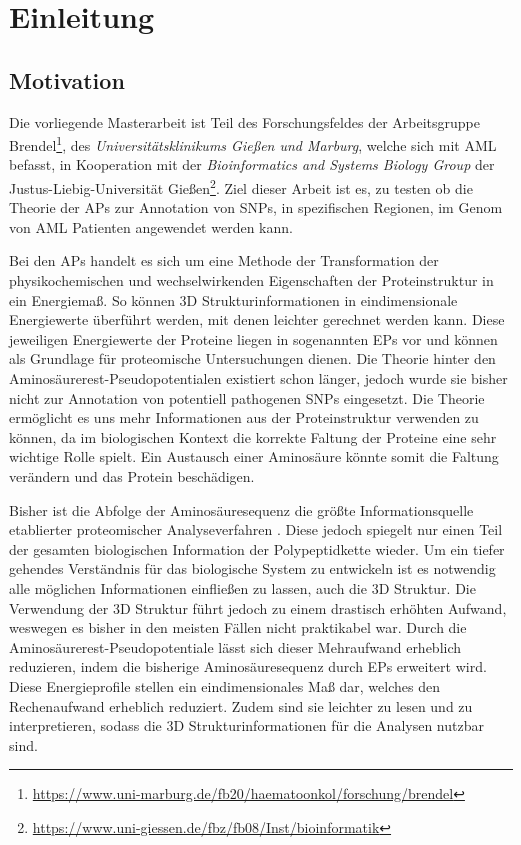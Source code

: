 \chapter{Einleitung}
\label{cha:Einleitung}

\section{Motivation}

Die vorliegende Masterarbeit ist Teil des Forschungsfeldes der Arbeitsgruppe Brendel\footnote{\url{https://www.uni-marburg.de/fb20/haematoonkol/forschung/brendel}}, des \emph{Universitätsklinikums Gießen und Marburg}, welche sich mit \ac{AML} befasst, in Kooperation mit der \emph{Bioinformatics and Systems Biology Group} der Justus-Liebig-Universität Gießen\footnote{\url{https://www.uni-giessen.de/fbz/fb08/Inst/bioinformatik}}. Ziel dieser Arbeit ist es, zu testen ob die Theorie der \ac{APs} zur Annotation von \ac{SNPs}, in spezifischen Regionen, im Genom von \ac{AML} Patienten angewendet werden kann.

Bei den \ac{APs} handelt es sich um eine Methode der Transformation der physikochemischen und wechselwirkenden Eigenschaften der Proteinstruktur in ein Energiemaß. So können 3D Strukturinformationen in eindimensionale Energiewerte überführt werden, mit denen leichter gerechnet werden kann. Diese jeweiligen Energiewerte der Proteine liegen in sogenannten \ac{EPs} vor und können als Grundlage für proteomische Untersuchungen dienen. Die Theorie hinter den Aminosäurerest-Pseudopotentialen existiert schon länger, jedoch wurde sie bisher nicht zur Annotation von potentiell pathogenen \ac{SNPs} eingesetzt. Die Theorie ermöglicht es uns mehr Informationen aus der Proteinstruktur verwenden zu können, da im biologischen Kontext die korrekte Faltung der Proteine eine sehr wichtige Rolle spielt. Ein Austausch einer Aminosäure könnte somit die Faltung verändern und das Protein beschädigen. 

Bisher ist die Abfolge der Aminosäuresequenz die größte Informationsquelle etablierter proteomischer Analyseverfahren \cite{Landels.2015}. Diese jedoch spiegelt nur einen Teil der gesamten biologischen Information der Polypeptidkette wieder. Um ein tiefer gehendes Verständnis für das biologische System zu entwickeln ist es notwendig alle möglichen Informationen einfließen zu lassen, auch die 3D Struktur. Die Verwendung der 3D Struktur führt jedoch zu einem drastisch erhöhten Aufwand, weswegen es bisher in den meisten Fällen nicht praktikabel war. Durch die Aminosäurerest-Pseudopotentiale lässt sich dieser Mehraufwand erheblich reduzieren, indem die bisherige Aminosäuresequenz durch \ac{EPs} erweitert wird. Diese Energieprofile stellen ein eindimensionales Maß dar, welches den Rechenaufwand erheblich reduziert. Zudem sind sie leichter zu lesen und zu interpretieren, sodass die 3D Strukturinformationen für die Analysen nutzbar sind.


